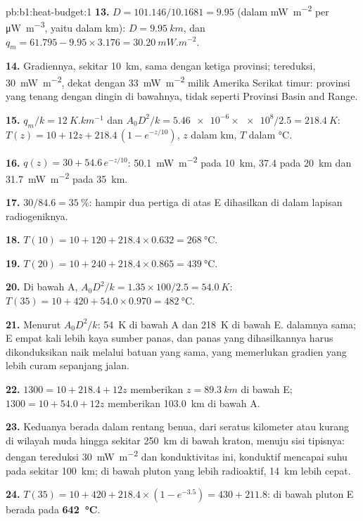 \begin{solution}{pb:b1:heat-budget:1}
\textbf{13.} $D = 101.146/10.1681 = 9.95$ (dalam \unit{mW.m^{-2}} per
\unit{\micro W.m^{-3}}, yaitu dalam km): $D = \qty{9.95}{km}$, dan $q_m = 61.795 -
9.95\times3.176 = \qty{30.20}{mW.m^{-2}}$.

\textbf{14.} Gradiennya, sekitar \qty{10}{km}, sama dengan ketiga provinsi;  tereduksi, \qty{30}{mW.m^{-2}}, dekat dengan \qty{33}{mW.m^{-2}} milik Amerika Serikat timur: provinsi yang tenang dengan  dingin di bawahnya, tidak seperti Provinsi Basin and Range.

\textbf{15.} $q_m/k = \qty{12}{K.km^{-1}}$ dan $A_0D^2/k = \num{5.46e-6}\times\num{e8}/2.5
= \qty{218.4}{K}$: $T(z) = 10 + 12z + 218.4\,(1 - e^{-z/10})$, $z$ dalam km, $T$ dalam
\unit{\degreeCelsius}.

\textbf{16.} $q(z) = 30 + 54.6\,e^{-z/10}$: \qty{50.1}{mW.m^{-2}} pada \qty{10}{km},
\num{37.4} pada \qty{20}{km} dan \qty{31.7}{mW.m^{-2}} pada \qty{35}{km}.

\textbf{17.} $30/84.6 = \qty{35}{\percent}$: hampir dua pertiga 
di atas E dihasilkan di dalam lapisan radiogeniknya.

\textbf{18.} $T(10) = 10 + 120 + 218.4\times0.632 = \qty{268}{\degreeCelsius}$.

\textbf{19.} $T(20) = 10 + 240 + 218.4\times0.865 = \qty{439}{\degreeCelsius}$.

\textbf{20.} Di bawah A, $A_0D^2/k = 1.35\times100/2.5 = \qty{54.0}{K}$:
$T(35) = 10 + 420 + 54.0\times0.970 = \qty{482}{\degreeCelsius}$.

\textbf{21.} Menurut $A_0D^2/k$: \qty{54}{K} di bawah A dan \qty{218}{K} di bawah E.  dalamnya sama;  E empat kali lebih kaya sumber panas, dan panas yang dihasilkannya harus dikonduksikan naik melalui batuan yang sama, yang memerlukan gradien yang lebih curam sepanjang jalan.

\textbf{22.} $1300 = 10 + 218.4 + 12z$ memberikan $z = \qty{89.3}{km}$ di bawah E;
$1300 = 10 + 54.0 + 12z$ memberikan \qty{103.0}{km} di bawah A.

\textbf{23.} Keduanya berada dalam rentang  benua, dari seratus kilometer atau kurang di wilayah muda hingga sekitar \qty{250}{km} di bawah kraton, menuju sisi tipisnya: dengan  tereduksi \qty{30}{mW.m^{-2}} dan konduktivitas ini,  konduktif mencapai suhu  pada sekitar \qty{100}{km}; di bawah pluton yang lebih radioaktif, \qty{14}{km} lebih cepat.

\textbf{24.} $T(35) = 10 + 420 + 218.4\times(1 - e^{-3.5}) = 430 + 211.8$:  di bawah pluton E berada pada
\textbf{\qty[text-series-to-math=true]{642}{\degreeCelsius}}.
\end{solution}
